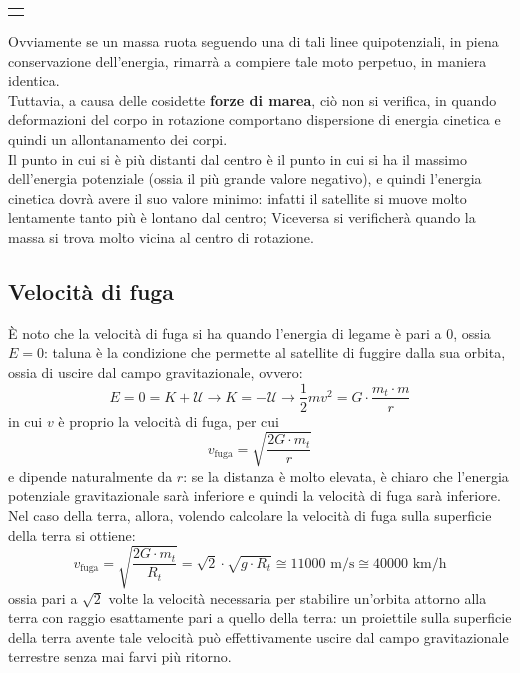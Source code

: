 \documentclass[a4paper]{extarticle}
\begin{document}
\vspace{2em}
\noindent
{}
\begin{tabularx}{\textwidth}{P}
  {
      \centering
  }
\end{tabularx}

\vspace{1em}
\noindent
Ovviamente se un massa ruota seguendo una di tali linee quipotenziali, in piena conservazione dell'energia, rimarrà a compiere tale moto perpetuo, in maniera identica.\\
Tuttavia, a causa delle cosidette \textbf{forze di marea}, ciò non si verifica, in quando deformazioni del corpo in rotazione comportano dispersione di energia cinetica e quindi un allontanamento dei corpi.\\
Il punto in cui si è più distanti dal centro è il punto in cui si ha il massimo dell'energia potenziale (ossia il più grande valore negativo), e quindi l'energia cinetica dovrà avere il suo valore minimo: infatti il satellite si muove molto lentamente tanto più è lontano dal centro; Viceversa si verificherà quando la massa si trova molto vicina al centro di rotazione.

\vspace{1em}
\subsection{Velocità di fuga}
È noto che la velocità di fuga si ha quando l'energia di legame è pari a $0$, ossia $E=0$: taluna è la condizione che permette al satellite di fuggire dalla sua orbita, ossia di uscire dal campo gravitazionale, ovvero:
\[E=0=K+\mathcal{U} \longrightarrow K=-\mathcal{U} \longrightarrow \frac{1}{2}m v^2 = G \cdot \frac{m_t \cdot m}{r}\]
in cui $v$ è proprio la velocità di fuga, per cui
\[\boxed{v_{\text{fuga}} = \sqrt{\frac{2G \cdot m_t}{r}}}\]
e dipende naturalmente da $r$: se la distanza è molto elevata, è chiaro che l'energia potenziale gravitazionale sarà inferiore e quindi la velocità di fuga sarà inferiore.\\
Nel caso della terra, allora, volendo calcolare la velocità di fuga sulla superficie della terra si ottiene:
\[v_{\text{fuga}} = \sqrt{\frac{2G \cdot m_t}{R_t}} = \sqrt{2} \cdot \sqrt{g \cdot R_t} \cong 11 000 \text{ m/s} \cong 40 000 \text{ km/h}\]
ossia pari a $\sqrt{2}$ volte la velocità necessaria per stabilire un'orbita attorno alla terra con raggio esattamente pari a quello della terra: un proiettile sulla superficie della terra avente tale velocità può effettivamente uscire dal campo gravitazionale terrestre senza mai farvi più ritorno.
\end{document}
